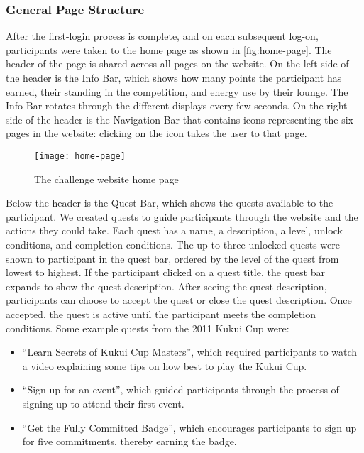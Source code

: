 \subsubsection{General Page Structure}

After the first-login process is complete, and on each subsequent log-on, participants were taken to the home page as shown in \autoref{fig:home-page}. The header of the page is shared across all pages on the website. On the left side of the header is the Info Bar, which shows how many points the participant has earned, their standing in the competition, and energy use by their lounge. The Info Bar rotates through the different displays every few seconds. On the right side of the header is the Navigation Bar that contains icons representing the six pages in the website: clicking on the icon takes the user to that page.

\begin{figure}[htbp]
	\centering
		\texttt{[image: home-page]}
		\caption{The challenge website home page}
\label{fig:home-page}
\end{figure}

Below the header is the Quest Bar, which shows the quests available to the participant. We created quests to guide participants through the website and the actions they could take. Each quest has a name, a description, a level, unlock conditions, and completion conditions. The up to three unlocked quests were shown  to participant in the quest bar, ordered by the level of the quest from lowest to highest. If the participant clicked on a quest title, the quest bar expands to show the quest description. After seeing the quest description, participants can choose to accept the quest or close the quest description. Once accepted, the quest is active until the participant meets the completion conditions. Some example quests from the 2011 Kukui Cup were:

\begin{itemize}
	\item ``Learn Secrets of Kukui Cup Masters'', which required participants to watch a video explaining some tips on how best to play the Kukui Cup.
	\item ``Sign up for an event'', which guided participants through the process of signing up to attend their first event.
	\item ``Get the Fully Committed Badge'', which encourages participants to sign up for five commitments, thereby earning the badge.
\end{itemize}

